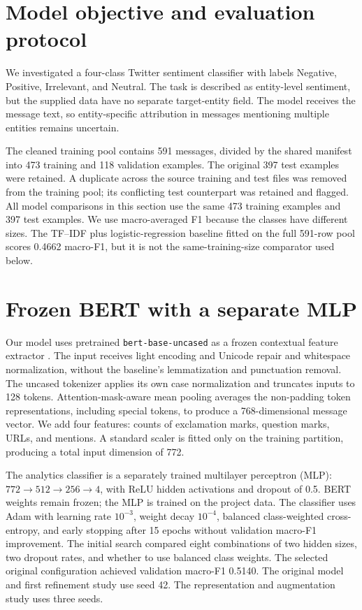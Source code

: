 \section{Model objective and evaluation protocol}
We investigated a four-class Twitter sentiment classifier with labels Negative, Positive, Irrelevant, and Neutral. The task is described as entity-level sentiment, but the supplied data have no separate target-entity field. The model receives the message text, so entity-specific attribution in messages mentioning multiple entities remains uncertain.

The cleaned training pool contains 591 messages, divided by the shared manifest into 473 training and 118 validation examples. The original 397 test examples were retained. A duplicate across the source training and test files was removed from the training pool; its conflicting test counterpart was retained and flagged. All model comparisons in this section use the same 473 training examples and 397 test examples. We use macro-averaged F1 because the classes have different sizes. The TF--IDF plus logistic-regression baseline fitted on the full 591-row pool scores 0.4662 macro-F1, but it is not the same-training-size comparator used below.

\section{Frozen BERT with a separate MLP}
Our model uses pretrained \texttt{bert-base-uncased} as a frozen contextual feature extractor \cite{bert}. The input receives light encoding and Unicode repair and whitespace normalization, without the baseline's lemmatization and punctuation removal. The uncased tokenizer applies its own case normalization and truncates inputs to 128 tokens. Attention-mask-aware mean pooling averages the non-padding token representations, including special tokens, to produce a 768-dimensional message vector. We add four features: counts of exclamation marks, question marks, URLs, and mentions. A standard scaler is fitted only on the training partition, producing a total input dimension of 772.

The analytics classifier is a separately trained multilayer perceptron (MLP): $772\rightarrow512\rightarrow256\rightarrow4$, with ReLU hidden activations and dropout of 0.5. BERT weights remain frozen; the MLP is trained on the project data. The classifier uses Adam with learning rate $10^{-3}$, weight decay $10^{-4}$, balanced class-weighted cross-entropy, and early stopping after 15 epochs without validation macro-F1 improvement. The initial search compared eight combinations of two hidden sizes, two dropout rates, and whether to use balanced class weights. The selected original configuration achieved validation macro-F1 0.5140. The original model and first refinement study use seed 42. The representation and augmentation study uses three seeds.

